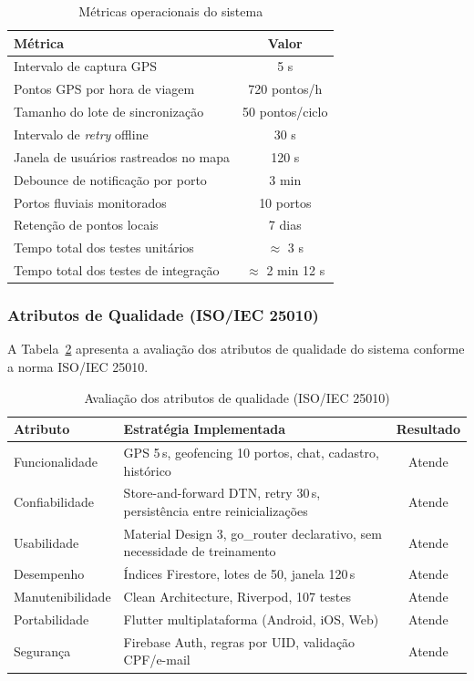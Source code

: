 \documentclass[12pt]{article}
\begin{document}
\begin{table}[H]
\caption{Métricas operacionais do sistema}
\label{tab:metricas}
\centering
\renewcommand{\arraystretch}{1.25}
\begin{tabular}{lc}
\toprule
\textbf{Métrica} & \textbf{Valor} \\
\midrule
Intervalo de captura GPS & 5 s \\
Pontos GPS por hora de viagem & 720 pontos/h \\
Tamanho do lote de sincronização & 50 pontos/ciclo \\
Intervalo de \textit{retry} offline & 30 s \\
Janela de usuários rastreados no mapa & 120 s \\
Debounce de notificação por porto & 3 min \\
Portos fluviais monitorados & 10 portos \\
Retenção de pontos locais & 7 dias \\
Tempo total dos testes unitários & $\approx$ 3 s \\
Tempo total dos testes de integração & $\approx$ 2 min 12 s \\
\bottomrule
\end{tabular}
\end{table}

\subsubsection{Atributos de Qualidade (ISO/IEC 25010)}

A Tabela~\ref{tab:qualidade} apresenta a avaliação dos atributos de qualidade do sistema conforme a norma ISO/IEC 25010.

\begin{table}[H]
\caption{Avaliação dos atributos de qualidade (ISO/IEC 25010)}
\label{tab:qualidade}
\centering
\renewcommand{\arraystretch}{1.25}
\begin{tabularx}{\textwidth}{lXc}
\toprule
\textbf{Atributo} & \textbf{Estratégia Implementada} & \textbf{Resultado} \\
\midrule
Funcionalidade    & GPS 5\,s, geofencing 10 portos, chat, cadastro, histórico & Atende \\
Confiabilidade    & Store-and-forward DTN, retry 30\,s, persistência entre reinicializações & Atende \\
Usabilidade       & Material Design 3, go\_router declarativo, sem necessidade de treinamento & Atende \\
Desempenho        & Índices Firestore, lotes de 50, janela 120\,s & Atende \\
Manutenibilidade  & Clean Architecture, Riverpod, 107 testes & Atende \\
Portabilidade     & Flutter multiplataforma (Android, iOS, Web) & Atende \\
Segurança         & Firebase Auth, regras por UID, validação CPF/e-mail & Atende \\
\bottomrule
\end{tabularx}
\end{table}
\end{document}
